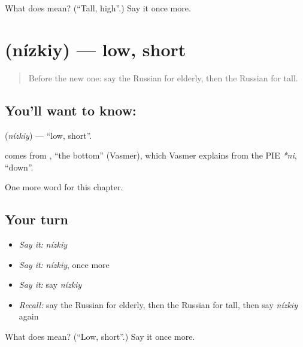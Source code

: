 \begin{tcolorbox}[breakable,colback=teal!4,colframe=teal!35!black,title={Before you move on}]
What does  mean? (\textquotedblleft{}Tall, high\textquotedblright{}.) Say it once more.
\end{tcolorbox}
\section[\texorpdfstring{\ru{низкий} (nízkiy)}{низкий (nízkiy)}]{ (nízkiy) — low, short}

\label{lesson:RU-C243-nizkiy}



\begin{quote}
Before the new one: say the Russian for elderly, then the Russian for tall.
\end{quote}

\subsection*{You'll want to know: }
\textbf{} (\emph{nízkiy}) — \textquotedblleft{}low, short\textquotedblright{}.

\begin{cousinweb}
\textbf{} comes from \emph{}, \textquotedblleft{}the bottom\textquotedblright{} (Vasmer), which Vasmer explains from the PIE \emph{*ni}, \textquotedblleft{}down\textquotedblright{}.
\end{cousinweb}

\begin{grammarlens}[title={What you've built}]
One more word for this chapter.
\end{grammarlens}

\subsection*{Your turn}
\begin{itemize}
\raggedright
  \item \emph{Say it:} \emph{nízkiy}
  \item \emph{Say it:} \emph{nízkiy}, once more
  \item \emph{Say it:} say \emph{nízkiy}
  \item \emph{Recall:} say the Russian for elderly, then the Russian for tall, then say \emph{nízkiy} again
\end{itemize}

\begin{tcolorbox}[breakable,colback=teal!4,colframe=teal!35!black,title={Before you move on}]
What does  mean? (\textquotedblleft{}Low, short\textquotedblright{}.) Say it once more.
\end{tcolorbox}
